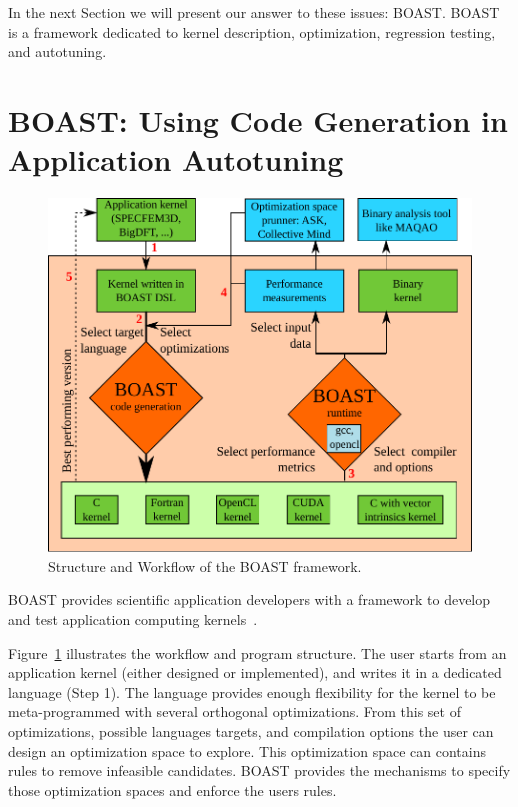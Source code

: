 \documentclass{IEEEtran}
\begin{document}
In the next Section we will present our answer to these issues: BOAST.  BOAST
is a framework dedicated to kernel description, optimization, regression
testing, and autotuning.

\section{BOAST: Using Code Generation in Application Autotuning\label{sec:boast}}

\begin{figure}
\begin{center}
\includegraphics[width=\columnwidth]{BOAST_Workflow.pdf}
\caption{Structure and Workflow of the BOAST framework.}
\label{fig:boast_workflow}
\end{center}
\end{figure}

BOAST provides scientific application developers with a framework to develop and
test application computing kernels~\cite{videau2013boast}.

Figure~\ref{fig:boast_workflow} illustrates the workflow and program structure.
The user starts from an application kernel (either designed or implemented),
and writes it in a dedicated language (Step 1). The language provides enough
flexibility for the kernel to be meta-programmed with several orthogonal
optimizations. From this set of optimizations, possible languages targets, and
compilation options the user can design an optimization space to explore. This
optimization space can contains rules to remove infeasible candidates. BOAST
provides the mechanisms to specify those optimization spaces and enforce the
users rules.
\end{document}
